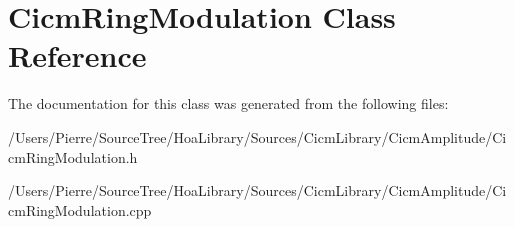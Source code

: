 \hypertarget{class_cicm_ring_modulation}{\section{Cicm\-Ring\-Modulation Class Reference}
\label{class_cicm_ring_modulation}
}


The documentation for this class was generated from the following files\-:\begin{DoxyCompactItemize}
\item 
/\-Users/\-Pierre/\-Source\-Tree/\-Hoa\-Library/\-Sources/\-Cicm\-Library/\-Cicm\-Amplitude/Cicm\-Ring\-Modulation.\-h\item 
/\-Users/\-Pierre/\-Source\-Tree/\-Hoa\-Library/\-Sources/\-Cicm\-Library/\-Cicm\-Amplitude/Cicm\-Ring\-Modulation.\-cpp\end{DoxyCompactItemize}
